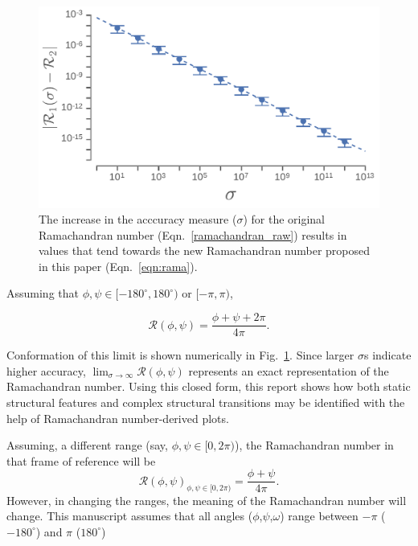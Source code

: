\documentclass[fleqn,10pt,lineno]{wlpeerj} %
\newcommand{\Fig}[1]{Fig.~\ref{#1}}
\newcommand{\Eqn}[1]{Eqn.~\ref{#1}}
\begin{document}
\begin{figure}[b!]
\centering
\includegraphics[width=0.6\linewidth]{automated_figures/fig_R_vs_R2.pdf}
\caption{The increase in the acccuracy measure ($\sigma$) for the original Ramachandran number (\Eqn{ramachandran_raw}) results in values that tend towards the new Ramachandran number proposed in this paper (\Eqn{eqn:rama}).\label{fig:sigma}} 
\end{figure} 

Assuming that $\phi,\psi \in [-180^\circ,180^\circ)$ or $[-\pi,\pi)$,

\begin{equation}
\mathcal{R}(\phi,\psi) = \frac{\phi+\psi+2\pi}{4\pi}.
\label{rama2}
\end{equation}

Conformation of this limit is shown numerically in \Fig{fig:sigma}. Since larger $\sigma$s indicate higher accuracy, $\displaystyle\lim_{\sigma\to\infty}{\mathcal{R}}(\phi,\psi)$ represents an exact representation of the Ramachandran number. Using this closed form, this report shows how both static structural features and complex structural transitions may be identified with the help of Ramachandran number-derived plots.

Assuming, a different range (say, $\phi,\psi \in [0,2\pi)$), the Ramachandran number in that frame of reference will be
\begin{equation}
{\mathcal{R}}(\phi,\psi)_{\phi,\psi \in [0,2\pi)} = \frac{\phi+\psi}{4\pi}.
\label{ramaGeneral}
\end{equation}
However, in changing the ranges, the meaning of the Ramachandran number will change. This manuscript assumes that all angles ($\phi$,$\psi$,$\omega$) range between $-\pi$ ($-180^\circ$) and $\pi$ ($180^\circ$)



\end{document}
